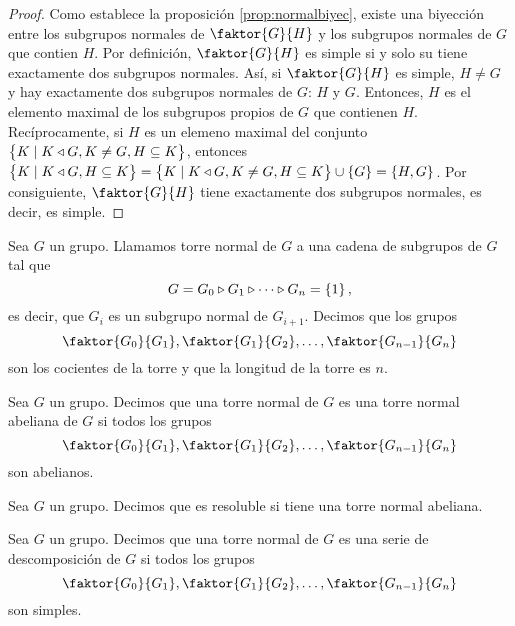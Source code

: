 \begin{proof}
    Como establece la proposición \ref{prop:normalbiyec}, existe una biyección entre los subgrupos normales de $\faktor{G}{H}$ y los subgrupos normales de $G$ que contien $H$. Por definición, $\faktor{G}{H}$ es simple si y solo su tiene exactamente dos subgrupos normales. Así, si $\faktor{G}{H}$ es simple, $H\neq G$ y hay exactamente dos subgrupos normales de $G$: $H$ y $G$. Entonces, $H$ es el elemento maximal de los subgrupos propios de $G$ que contienen $H$. Recíprocamente, si $H$ es un elemeno maximal del conjunto $\left\{ K\mid K\triangleleft G, K\neq G, H\subseteq K\right\}$, entonces $\left\{ K\mid K\triangleleft G, H\subseteq K\right\} = \left\{ K\mid K\triangleleft G, K\neq G, H\subseteq K\right\} \cup \left\{ G\right\}=\left\{ H, G\right\}$. Por consiguiente, $\faktor{G}{H}$ tiene exactamente dos subgrupos normales, es decir, es simple.
\end{proof}
\begin{defi}
    Sea $G$ un grupo. Llamamos torre normal de $G$ a una cadena de subgrupos de $G$ tal que
    \[
        G=G_0\triangleright G_1\triangleright\cdots\triangleright G_n=\left\{ 1\right\},
    \]
    es decir, que $G_i$ es un subgrupo normal de $G_{i+1}$. Decimos que los grupos
    \[
        \faktor{G_0}{G_1}, \faktor{G_1}{G_2}, \dots, \faktor{G_{n-1}}{G_n}
    \]
    son los cocientes de la torre y que la longitud de la torre es $n$.
\end{defi}
\begin{defi}
    Sea $G$ un grupo. Decimos que una torre normal de $G$ es una torre normal abeliana de $G$ si todos los grupos
    \[
        \faktor{G_0}{G_1}, \faktor{G_1}{G_2}, \dots, \faktor{G_{n-1}}{G_n}
    \]
    son abelianos.
\end{defi}
\begin{defi}
    Sea $G$ un grupo. Decimos que es resoluble si tiene una torre normal abeliana.
\end{defi}
\begin{defi}
    Sea $G$ un grupo. Decimos que una torre normal de $G$ es una serie de descomposición de $G$ si todos los grupos
    \[
        \faktor{G_0}{G_1}, \faktor{G_1}{G_2}, \dots, \faktor{G_{n-1}}{G_n}
    \]
    son simples.
\end{defi}
